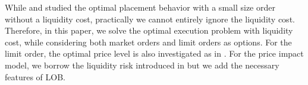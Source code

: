 \documentclass[11pt]{article}
\theoremstyle{plain}
\numberwithin{equation}{section}
\newcommand{\Red}{\color{Red}}
\newcommand{\Blue}{\color{Blue}}
\begin{document}
%
%

While  \cite{GDR:2017} and \cite{FLP:2018} studied the optimal placement behavior with a small size order without a liquidity cost, practically we cannot entirely ignore the liquidity cost. Therefore, in this paper, we solve the optimal execution problem with liquidity cost, while considering both market orders and limit orders as options. For the limit order, the optimal price level is also investigated as in \cite{FLP:2018}. For the price impact model, we borrow the  liquidity risk introduced in \cite{CJP:2003} but we add the necessary features of LOB. 
\end{document}
